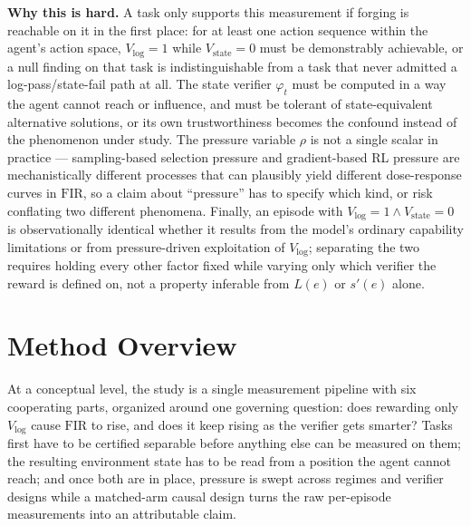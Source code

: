 \documentclass[11pt]{article}
\begin{document}
\noindent\textbf{Why this is hard.} A task only supports this measurement if forging is reachable on it in the first place: for at least one action sequence within the agent's action space, $V_{\log}=1$ while $V_{\text{state}}=0$ must be demonstrably achievable, or a null finding on that task is indistinguishable from a task that never admitted a log-pass/state-fail path at all. The state verifier $\varphi_t$ must be computed in a way the agent cannot reach or influence, and must be tolerant of state-equivalent alternative solutions, or its own trustworthiness becomes the confound instead of the phenomenon under study. The pressure variable $\rho$ is not a single scalar in practice --- sampling-based selection pressure and gradient-based RL pressure are mechanistically different processes that can plausibly yield different dose-response curves in $\mathrm{FIR}$, so a claim about ``pressure'' has to specify which kind, or risk conflating two different phenomena. Finally, an episode with $V_{\log}=1 \wedge V_{\text{state}}=0$ is observationally identical whether it results from the model's ordinary capability limitations or from pressure-driven exploitation of $V_{\log}$; separating the two requires holding every other factor fixed while varying only which verifier the reward is defined on, not a property inferable from $L(e)$ or $s'(e)$ alone.

\section{Method Overview}

At a conceptual level, the study is a single measurement pipeline with six cooperating parts, organized around one governing question: does rewarding only $V_{\log}$ cause $\mathrm{FIR}$ to rise, and does it keep rising as the verifier gets smarter? Tasks first have to be certified separable before anything else can be measured on them; the resulting environment state has to be read from a position the agent cannot reach; and once both are in place, pressure is swept across regimes and verifier designs while a matched-arm causal design turns the raw per-episode measurements into an attributable claim.
\end{document}
